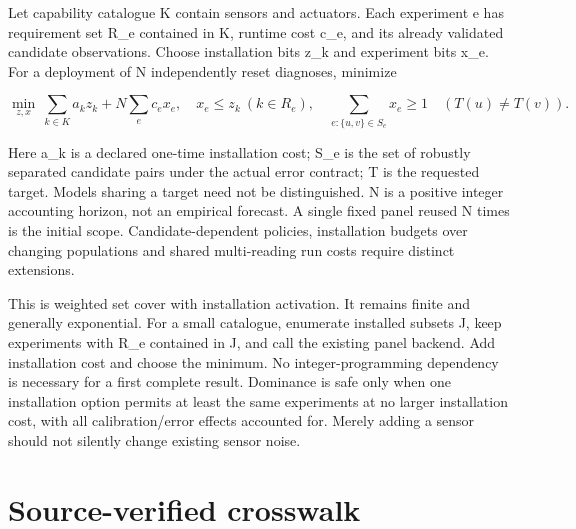 \documentclass[
  11pt,
  a4paper,
]{report}
\begin{document}
Let capability catalogue K contain sensors and actuators. Each
experiment e has requirement set R\_e contained in K, runtime cost c\_e,
and its already validated candidate observations. Choose installation
bits z\_k and experiment bits x\_e. For a deployment of N independently
reset diagnoses, minimize

\[
\min_{z,x}\ \sum_{k\in K}a_kz_k+N\sum_e c_ex_e,
\quad x_e\le z_k\ (k\in R_e),
\quad\sum_{e:\{u,v\}\in S_e}x_e\ge1\quad(T(u)\ne T(v)).
\]

Here a\_k is a declared one-time installation cost; S\_e is the set of
robustly separated candidate pairs under the actual error contract; T is
the requested target. Models sharing a target need not be distinguished.
N is a positive integer accounting horizon, not an empirical forecast. A
single fixed panel reused N times is the initial scope.
Candidate-dependent policies, installation budgets over changing
populations and shared multi-reading run costs require distinct
extensions.

This is weighted set cover with installation activation. It remains
finite and generally exponential. For a small catalogue, enumerate
installed subsets J, keep experiments with R\_e contained in J, and call
the existing panel backend. Add installation cost and choose the
minimum. No integer-programming dependency is necessary for a first
complete result. Dominance is safe only when one installation option
permits at least the same experiments at no larger installation cost,
with all calibration/error effects accounted for. Merely adding a sensor
should not silently change existing sensor noise.

\hypertarget{source-verified-crosswalk}{%
\section{Source-verified crosswalk}\label{source-verified-crosswalk}}
\end{document}
